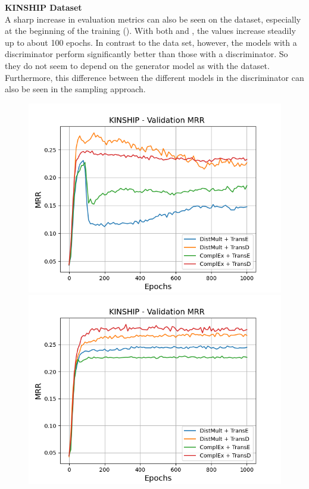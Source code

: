 \textbf{KINSHIP Dataset}
\label{subsubsec:methods_kinship}\\
%
A sharp increase in evaluation metrics can also be seen on the \kinship dataset, especially at the beginning of the training ().
With both \usmax and \ussoftmax, the values increase steadily up to about 100 epochs.
In contrast to the \umls data set, however, the models with a \transd discriminator perform significantly better than those with a \transe discriminator.
So they do not seem to depend on the generator model as with the \umls dataset.
Furthermore, this difference between the different models in the discriminator can also be seen in the \ussoftmax sampling approach.
\begin{figure}[H]
    \centering
    \begin{minipage}{.5\textwidth}
      \centering
      \includegraphics[width=0.9\linewidth]{figures/results/gan_train/not_pretrained/uncertainty/max/entropy/kinship/1k_epochs/uncertainty_kinship_mrrs.png}
    \end{minipage}%
    \begin{minipage}{.5\textwidth}
      \centering
      \includegraphics[width=0.9\linewidth]{figures/results/gan_train/not_pretrained/uncertainty/max_distribution/entropy/kinship/1k_epochs/uncertainty_kinship_mrrs.png}

\end{minipage}
\end{figure}
